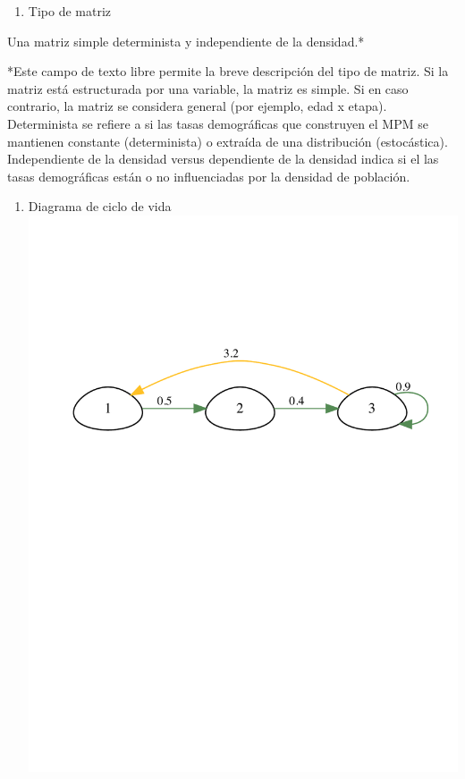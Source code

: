 \documentclass[
]{book}
\providecommand{\tightlist}{%
  \setlength{\itemsep}{0pt}\setlength{\parskip}{0pt}}
\theoremstyle{definition}
\theoremstyle{definition}
\theoremstyle{definition}
\theoremstyle{definition}
\theoremstyle{remark}
\begin{document}
\begin{enumerate}
\def\labelenumi{(\Alph{enumi})}
\tightlist
\item
  Tipo de matriz
\end{enumerate}

Una matriz simple determinista y independiente de la densidad.*

*Este campo de texto libre permite la breve descripción del tipo de matriz. Si la matriz está estructurada por una variable, la matriz es simple. Si en caso contrario, la matriz se considera general (por ejemplo, edad x etapa). Determinista se refiere a si las tasas demográficas que construyen el MPM se mantienen
constante (determinista) o extraída de una distribución (estocástica). Independiente de la densidad
versus dependiente de la densidad indica si el las tasas demográficas están o no influenciadas por la densidad de población.

\begin{enumerate}
\def\labelenumi{(\Alph{enumi})}
\setcounter{enumi}{1}
\tightlist
\item
  Diagrama de ciclo de vida
  \includegraphics{Diagnostico_Poblacional_files/figure-latex/unnamed-chunk-31-1.pdf}
\end{enumerate}
\end{document}
